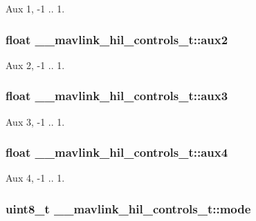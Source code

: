 Aux 1, -\/1 .. 1. 

\hypertarget{struct____mavlink__hil__controls__t_a34ee57a5807ad445506db9ba666e13d1}{
\subsubsection[{aux2}]{\setlength{\rightskip}{0pt plus 5cm}float \+\_\+\+\_\+mavlink\+\_\+hil\+\_\+controls\+\_\+t\+::aux2}}\label{struct____mavlink__hil__controls__t_a34ee57a5807ad445506db9ba666e13d1}


Aux 2, -\/1 .. 1. 

\hypertarget{struct____mavlink__hil__controls__t_ac90aa43f5be0ad189f9e42a4afec883f}{
\subsubsection[{aux3}]{\setlength{\rightskip}{0pt plus 5cm}float \+\_\+\+\_\+mavlink\+\_\+hil\+\_\+controls\+\_\+t\+::aux3}}\label{struct____mavlink__hil__controls__t_ac90aa43f5be0ad189f9e42a4afec883f}


Aux 3, -\/1 .. 1. 

\hypertarget{struct____mavlink__hil__controls__t_a0b636589ba52581e9e7cde07f8f90e12}{
\subsubsection[{aux4}]{\setlength{\rightskip}{0pt plus 5cm}float \+\_\+\+\_\+mavlink\+\_\+hil\+\_\+controls\+\_\+t\+::aux4}}\label{struct____mavlink__hil__controls__t_a0b636589ba52581e9e7cde07f8f90e12}


Aux 4, -\/1 .. 1. 

\hypertarget{struct____mavlink__hil__controls__t_a44828f146b2d8fa81c7da0e844a18e39}{
\subsubsection[{mode}]{\setlength{\rightskip}{0pt plus 5cm}uint8\+\_\+t \+\_\+\+\_\+mavlink\+\_\+hil\+\_\+controls\+\_\+t\+::mode}}\label{struct____mavlink__hil__controls__t_a44828f146b2d8fa81c7da0e844a18e39}


